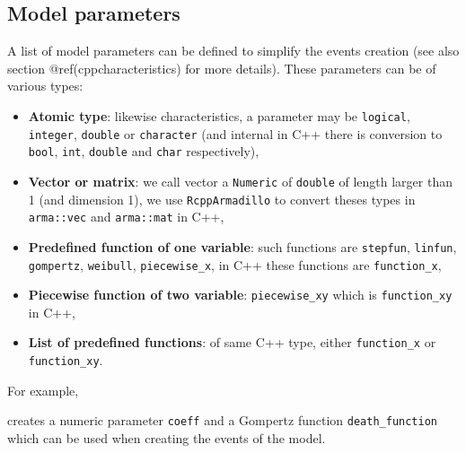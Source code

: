 \hypertarget{params}{%
\subsection{Model parameters}\label{params}}

A list of model parameters can be defined to simplify the events creation (see also section @ref(cppcharacteristics) for more details). These parameters can be of various types:

\begin{itemize}
\tightlist
\item
  \textbf{Atomic type}: likewise characteristics, a parameter may be \texttt{logical}, \texttt{integer}, \texttt{double} or \texttt{character} (and internal in C++ there is conversion to \texttt{bool}, \texttt{int}, \texttt{double} and \texttt{char} respectively),
\item
  \textbf{Vector or matrix}: we call vector a \texttt{Numeric} of \texttt{double} of length larger than 1 (and dimension 1), we use \texttt{RcppArmadillo} to convert theses types in \texttt{arma::vec} and \texttt{arma::mat} in C++,
\item
  \textbf{Predefined function of one variable}: such functions are \texttt{stepfun}, \texttt{linfun}, \texttt{gompertz}, \texttt{weibull}, \texttt{piecewise\_x}, in C++ these functions are \texttt{function\_x},
\item
  \textbf{Piecewise function of two variable}: \texttt{piecewise\_xy} which is \texttt{function\_xy} in C++,
\item
  \textbf{List of predefined functions}: of same C++ type, either \texttt{function\_x} or \texttt{function\_xy}.
\end{itemize}

For example,

\begin{Shaded}
\begin{Highlighting}[]
\OtherTok{\textless{}{-}} \NormalTok{(} \OtherTok{=} \NormalTok{,}
                \OtherTok{=} \NormalTok{(}\NormalTok{, }\NormalTok{))}
\end{Highlighting}
\end{Shaded}

creates a numeric parameter \texttt{coeff} and a Gompertz function \texttt{death\_function} which can be used when creating the events of the model.

